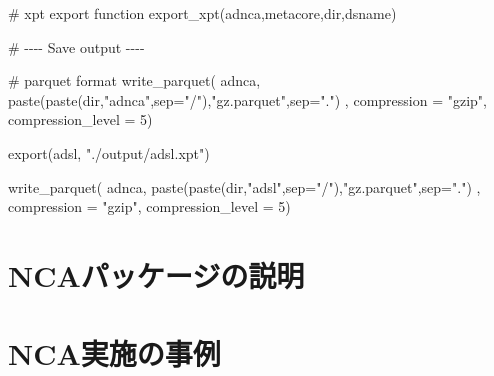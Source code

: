 \documentclass[
  letterpaper,
  DIV=11,
  numbers=noendperiod]{scrreprt}
\newenvironment{Shaded}{\begin{snugshade}}{\end{snugshade}}
\newcommand{\AttributeTok}[1]{\textcolor[rgb]{0.40,0.45,0.13}{#1}}
\newcommand{\CommentTok}[1]{\textcolor[rgb]{0.37,0.37,0.37}{#1}}
\newcommand{\DecValTok}[1]{\textcolor[rgb]{0.68,0.00,0.00}{#1}}
\newcommand{\FunctionTok}[1]{\textcolor[rgb]{0.28,0.35,0.67}{#1}}
\newcommand{\NormalTok}[1]{\textcolor[rgb]{0.00,0.23,0.31}{#1}}
\newcommand{\StringTok}[1]{\textcolor[rgb]{0.13,0.47,0.30}{#1}}
\begin{document}
\begin{Shaded}
\begin{Highlighting}[]
\CommentTok{\# xpt export function}
\FunctionTok{export\_xpt}\NormalTok{(adnca,metacore,dir,dsname)}
  
\CommentTok{\# {-}{-}{-}{-} Save output {-}{-}{-}{-}}

\CommentTok{\# parquet format}
\FunctionTok{write\_parquet}\NormalTok{(}
\NormalTok{  adnca, }\FunctionTok{paste}\NormalTok{(}\FunctionTok{paste}\NormalTok{(dir,}\StringTok{"adnca"}\NormalTok{,}\AttributeTok{sep=}\StringTok{"/"}\NormalTok{),}\StringTok{"gz.parquet"}\NormalTok{,}\AttributeTok{sep=}\StringTok{"."}\NormalTok{)}
\NormalTok{              , }\AttributeTok{compression =} \StringTok{"gzip"}\NormalTok{, }\AttributeTok{compression\_level =} \DecValTok{5}\NormalTok{)}

\FunctionTok{export}\NormalTok{(adsl, }\StringTok{"./output/adsl.xpt"}\NormalTok{)}

\FunctionTok{write\_parquet}\NormalTok{(}
\NormalTok{  adnca, }\FunctionTok{paste}\NormalTok{(}\FunctionTok{paste}\NormalTok{(dir,}\StringTok{"adsl"}\NormalTok{,}\AttributeTok{sep=}\StringTok{"/"}\NormalTok{),}\StringTok{"gz.parquet"}\NormalTok{,}\AttributeTok{sep=}\StringTok{"."}\NormalTok{)}
\NormalTok{              , }\AttributeTok{compression =} \StringTok{"gzip"}\NormalTok{, }\AttributeTok{compression\_level =} \DecValTok{5}\NormalTok{)}
\end{Highlighting}
\end{Shaded}


\hypertarget{ncaux30d1ux30c3ux30b1ux30fcux30b8ux306eux8aacux660e}{%
\chapter{NCAパッケージの説明}\label{ncaux30d1ux30c3ux30b1ux30fcux30b8ux306eux8aacux660e}}


\hypertarget{ncaux5b9fux65bdux306eux4e8bux4f8b}{%
\chapter{NCA実施の事例}\label{ncaux5b9fux65bdux306eux4e8bux4f8b}}
\end{document}
